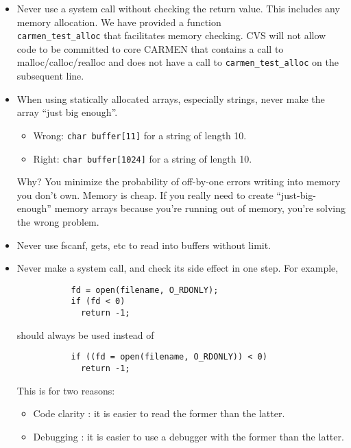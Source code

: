 \documentclass{article}
\begin{document}
\begin{itemize}

\item Never use a system call without checking the return value. This includes
any memory allocation. We have provided a function \\ \verb!carmen_test_alloc!
that facilitates memory checking. CVS will not allow code to be committed to
core CARMEN that contains a call to malloc/calloc/realloc and does not have a
call to \verb!carmen_test_alloc! on the subsequent line.

\item When using statically allocated arrays, especially strings, never make
the array ``just big enough''. 

\begin{itemize}
\item Wrong: \verb!char buffer[11]! for a string of length 10.  
\item Right: \verb!char buffer[1024]! for a string of length 10.
\end{itemize}

Why? You minimize the probability of off-by-one errors writing into memory you
don't own. Memory is cheap. If you really need to create ``just-big-enough''
memory arrays because you're running out of memory, you're solving the wrong
problem. 

\item Never use fscanf, gets, etc to read into buffers without limit. 

\item Never make a system call, and check its side effect in one step. For
example, 
\begin{verbatim}
           fd = open(filename, O_RDONLY);
           if (fd < 0)
             return -1;
\end{verbatim}
should always be used instead of 
\begin{verbatim}
           if ((fd = open(filename, O_RDONLY)) < 0)
             return -1;
\end{verbatim}
This is for two reasons:
  \begin{itemize}
  \item Code clarity : it is easier to read the former than the latter.
  \item Debugging : it is easier to use a debugger with the former than the latter. 
  \end{itemize}
  

\end{itemize}
\end{document}
